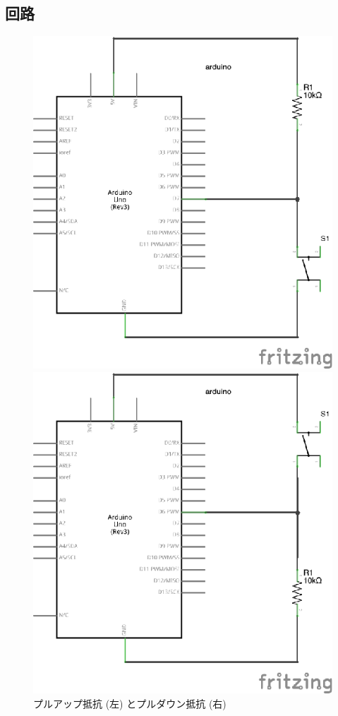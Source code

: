 \documentclass[11pt,a4paper]{jarticle}
\begin{document}

\subsection{回路}
\begin{figure}[htbp]
 \begin{minipage}{0.5\columnwidth}
  \centering
  \includegraphics[width=0.7\columnwidth]{img/pullup.eps}
 \end{minipage}
 \begin{minipage}{0.5\columnwidth}
  \centering
  \includegraphics[width=0.7\columnwidth]{img/pulldown.eps}
 \end{minipage}
  \caption{プルアップ抵抗 (左) とプルダウン抵抗 (右)}
\end{figure}
\end{document}
